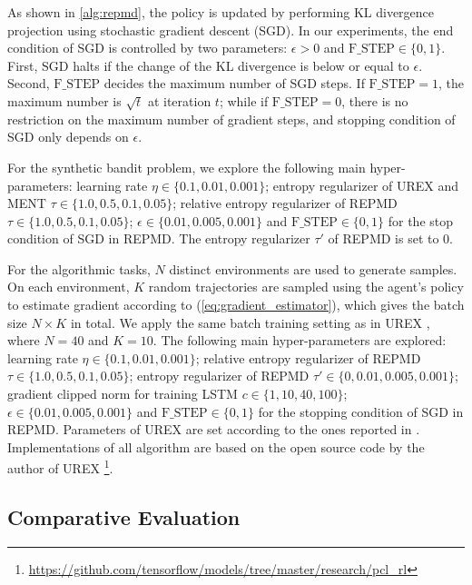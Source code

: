 \documentclass{article}
\begin{document}
As shown in \cref{alg:repmd}, the policy is updated by performing KL divergence projection using stochastic gradient descent (SGD). In our experiments, the end condition of SGD is controlled by two parameters: $\epsilon > 0$ and $\text{F\_STEP}\in \{0,1 \}$. First, SGD halts if the change of the KL divergence is below or equal to $\epsilon$. Second, $\text{F\_STEP}$ decides the maximum number of SGD steps. If $\text{F\_STEP}=1$, the maximum number is $\sqrt{t}$ at iteration $t$; while if $\text{F\_STEP}=0$, there is no restriction on the maximum number of gradient steps, and stopping condition of SGD only depends on $\epsilon$.

For the synthetic bandit problem, we explore the following main hyper-parameters: learning rate $\eta \in \{0.1, 0.01, 0.001\}$; entropy regularizer of UREX and MENT $\tau\in \{1.0, 0.5, 0.1, 0.05\}$; relative entropy regularizer of REPMD $\tau\in \{1.0, 0.5, 0.1, 0.05\}$; $\epsilon\in \{0.01, 0.005, 0.001\}$ and $\text{F\_STEP}\in \{0,1\}$ for the stop condition of SGD in REPMD. The entropy regularizer $\tau'$ of REPMD is set to 0.  

For the algorithmic tasks, $N$ distinct environments are used to generate samples. On each environment, $K$ random trajectories are sampled using the agent's policy to estimate gradient according to (\ref{eq:gradient_estimator}), which gives the batch size $N\times K$ in total. We apply the same batch training setting as in UREX \cite{nachum2017improving}, where $N=40$ and $K=10$. The following main hyper-parameters are explored: learning rate $\eta \in \{0.1, 0.01, 0.001\}$; relative entropy regularizer of REPMD $\tau\in \{1.0, 0.5, 0.1, 0.05\}$; entropy regularizer of REPMD $\tau'\in \{0, 0.01, 0.005, 0.001\}$; gradient clipped norm for training LSTM $c\in \{1, 10, 40, 100\}$; $\epsilon\in \{0.01, 0.005, 0.001\}$ and $\text{F\_STEP}\in \{0,1\}$ for the stopping condition of SGD in REPMD. Parameters of UREX are set according to the ones reported in \cite{nachum2017improving}. Implementations of all algorithm are based on the open source code by the author of UREX \footnote{\url{https://github.com/tensorflow/models/tree/master/research/pcl_rl}}.

\subsection{Comparative Evaluation}
\end{document}
